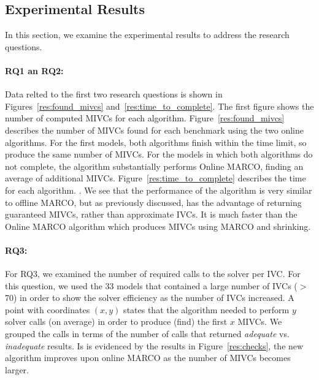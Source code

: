 \subsection{Experimental Results}
In this section, we examine the experimental results to address the research questions.

\paragraph{RQ1 an RQ2:}
Data relted to the first two research questions is shown in Figures~\ref{res:found_mivcs} and~\ref{res:time_to_complete}.  The first figure shows the number of computed MIVCs for each algorithm.    Figure~\ref{res:found_mivcs} describes the number of MIVCs found for each benchmark using the two online algorithms.  For the first  models, both algorithms finish within the time limit, so produce the same number of MIVCs.  For the  models in which both algorithms do not complete, the  algorithm substantially performs Online MARCO, finding an average of  additional MIVCs. Figure~\ref{res:time_to_complete} describes the time for each algorithm. .  We see that the performance of the  algorithm is very similar to offline MARCO, but as previously discussed, has the advantage of returning guaranteed MIVCs, rather than approximate IVCs.  It is much faster than the Online MARCO algorithm which produces MIVCs using MARCO and shrinking.

\paragraph{RQ3:}  For RQ3, we examined the number of required calls to the solver per IVC.  For this question, we used the 33 models that contained a large number of IVCs ($>$70) in order to show the solver efficiency as the number of IVCs increased.  A point with coordinates $(x,y)$ states that the algorithm needed to perform $y$ solver calls (on average) in order to produce (find) the first $x$ MIVCs. We grouped the calls in terms of the number of calls that returned {\em adequate} vs. {\em inadequate} results.  Is is evidenced by the results in Figure~\ref{res:checks}, the new algorithm improves upon online MARCO as the number of MIVCs becomes larger.



